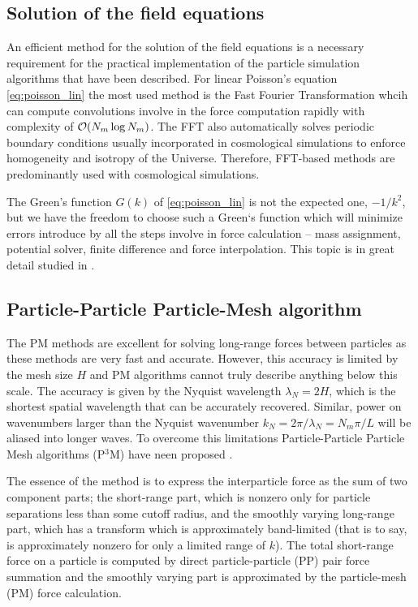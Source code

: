 \subsection{Solution of the field equations}
An efficient method for the solution of the field equations is a necessary requirement for the practical implementation of the particle simulation algorithms that have been described. For linear Poisson’s equation \eqref{eq:poisson_lin} the most used method is the Fast Fourier Transformation whcih can compute convolutions involve in the force computation rapidly with complexity of $\mathcal{O}(N_m\log N_m)$. The FFT also automatically solves periodic boundary conditions usually incorporated in cosmological simulations to enforce homogeneity and isotropy of the Universe. Therefore, FFT-based methods are predominantly used with cosmological simulations.

The Green's function $G(k)$ of \eqref{eq:poisson_lin} is not the expected one, $-1/k^2$, but we have the freedom to choose such a Green`s function which will minimize errors introduce by all the steps involve in force calculation -- mass assignment, potential solver, finite difference and force interpolation. This topic is in great detail studied in \textcite{Hockney:1988:CSU:62815}.
\subsection{Particle-Particle Particle-Mesh algorithm}
The PM methods are excellent for solving long-range forces between particles as these methods are very fast and accurate. However, this accuracy is limited by the mesh size $H$ and PM algorithms cannot truly describe anything below this scale. The accuracy is given by the Nyquist wavelength $\lambda_N=2H$, which is the shortest spatial wavelength that can be accurately recovered. Similar, power on wavenumbers larger than the Nyquist wavenumber $k_N=2\pi/\lambda_N=N_m\pi/L$ will be aliased into longer waves. To overcome this limitations Particle-Particle Particle Mesh algorithms (P$^3$M) have neen proposed \textcite{hockney_10000_1973}.

The essence of the method is to express the interparticle force as the sum of two component parts; the short-range part, which is nonzero only for particle separations less than some cutoff radius, and the smoothly varying long-range part, which has a transform which is approximately band-limited (that is to say, is approximately nonzero for only a limited range of $k$). The total short-range force on a particle is computed by direct particle-particle (PP) pair force summation and the smoothly varying part is approximated by the particle-mesh (PM) force calculation.

